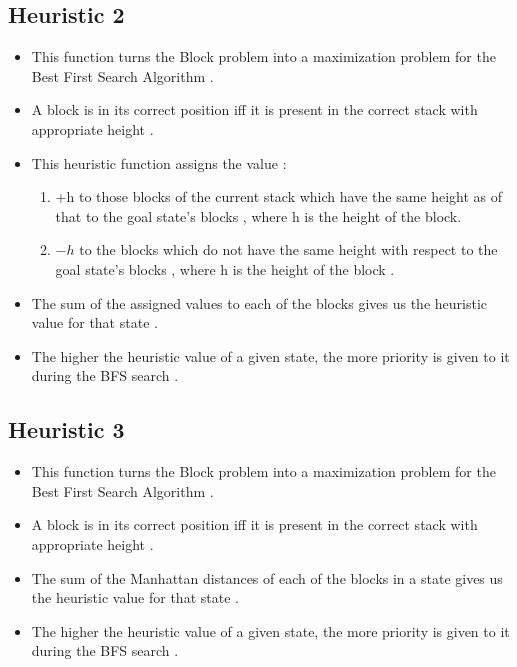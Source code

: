 \documentclass{article}
\begin{document}
\subsection{Heuristic 2}
\begin{itemize}
    \item This function turns the Block problem into a maximization problem for the Best First Search Algorithm .
    \item A block is in its correct position iff it is present in the correct stack with appropriate height .  
    \item This heuristic function assigns the value :
    \begin{enumerate}
        \item+h to those blocks of the current stack which
        have the same height as of that to the goal state's blocks , where h is the height of the block.
        \item$-h$ to the blocks which do not have the same height with respect to the
        goal state's blocks , where h is the height of the block .
    \end{enumerate}
    \item The sum of the assigned values to each of the blocks gives us the heuristic value for that state .
    \item The higher the heuristic value of a given state, the more priority is given to it during the BFS search .
\end{itemize}

\subsection{Heuristic 3}
\begin{itemize}
    \item This function turns the Block problem into a maximization problem for the Best First Search Algorithm .
    \item A block is in its correct position iff it is present in the correct stack with appropriate height .  
    \item The sum of the Manhattan distances of each of the blocks in a state gives us the heuristic value for that state .
    \item The higher the heuristic value of a given state, the more priority is given to it during the BFS search .
\end{itemize}
\newpage
\end{document}
